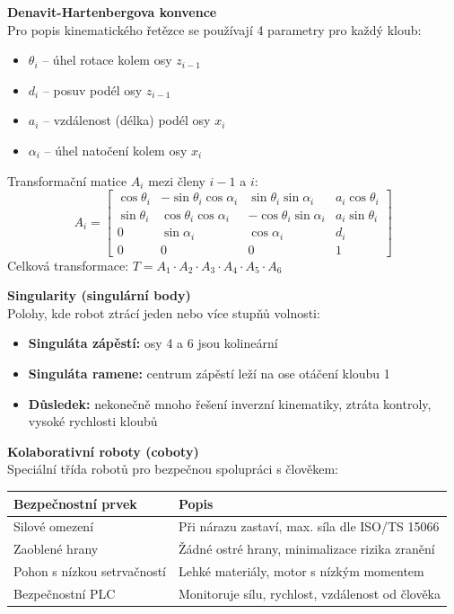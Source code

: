 \documentclass[a4paper,10pt]{article}
\begin{document}
\begin{vysvetlenibox}
\textbf{Denavit-Hartenbergova konvence}\\
Pro popis kinematického řetězce se používají 4 parametry pro každý kloub:
\begin{itemize}[noitemsep, leftmargin=1.4em, topsep=4pt]
    \item \textbf{$\theta_i$} -- úhel rotace kolem osy $z_{i-1}$
    \item \textbf{$d_i$} -- posuv podél osy $z_{i-1}$
    \item \textbf{$a_i$} -- vzdálenost (délka) podél osy $x_i$
    \item \textbf{$\alpha_i$} -- úhel natočení kolem osy $x_i$
\end{itemize}

\begin{vzorcebox}
Transformační matice $A_i$ mezi členy $i-1$ a $i$:
$$A_i = \begin{bmatrix}
\cos\theta_i & -\sin\theta_i\cos\alpha_i & \sin\theta_i\sin\alpha_i & a_i\cos\theta_i \\
\sin\theta_i & \cos\theta_i\cos\alpha_i & -\cos\theta_i\sin\alpha_i & a_i\sin\theta_i \\
0 & \sin\alpha_i & \cos\alpha_i & d_i \\
0 & 0 & 0 & 1
\end{bmatrix}$$
Celková transformace: $T = A_1 \cdot A_2 \cdot A_3 \cdot A_4 \cdot A_5 \cdot A_6$
\end{vzorcebox}

\textbf{Singularity (singulární body)}\\
Polohy, kde robot ztrácí jeden nebo více stupňů volnosti:
\begin{itemize}[noitemsep, leftmargin=1.4em, topsep=4pt]
    \item \textbf{Singuláta zápěstí:} osy 4 a 6 jsou kolineární
    \item \textbf{Singuláta ramene:} centrum zápěstí leží na ose otáčení kloubu 1
    \item \textbf{Důsledek:} nekonečně mnoho řešení inverzní kinematiky,
          ztráta kontroly, vysoké rychlosti kloubů
\end{itemize}

\textbf{Kolaborativní roboty (coboty)}\\
Speciální třída robotů pro bezpečnou spolupráci s člověkem:
\begin{center}
\begin{tabularx}{0.95\linewidth}{@{} l X @{}}
    \toprule
    \textbf{Bezpečnostní prvek} & \textbf{Popis} \\
    \midrule
    Silové omezení & Při nárazu zastaví, max. síla dle ISO/TS 15066 \\
    Zaoblené hrany & Žádné ostré hrany, minimalizace rizika zranění \\
    Pohon s nízkou setrvačností & Lehké materiály, motor s nízkým momentem \\
    Bezpečnostní PLC & Monitoruje sílu, rychlost, vzdálenost od člověka \\
    \bottomrule
\end{tabularx}
\end{center}


\end{vysvetlenibox}
\end{document}
